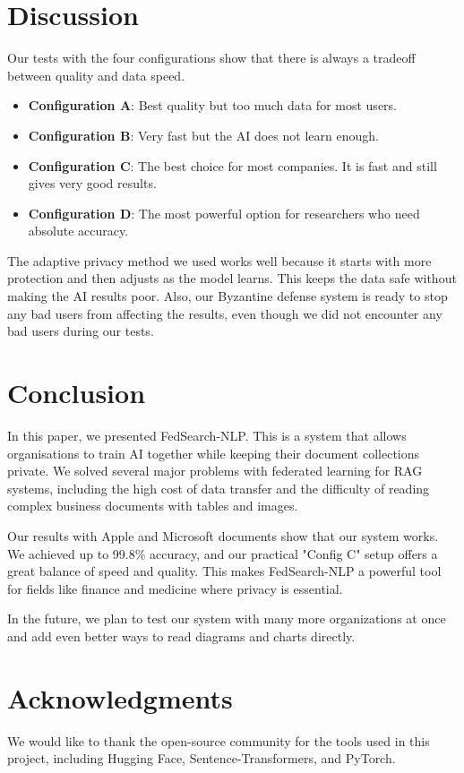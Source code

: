\documentclass[acmsmall,screen]{acmart}
\begin{document}
\section{Discussion}

Our tests with the four configurations show that there is always a tradeoff between quality and data speed.

\begin{itemize}
    \item \textbf{Configuration A}: Best quality but too much data for most users.
    \item \textbf{Configuration B}: Very fast but the AI does not learn enough.
    \item \textbf{Configuration C}: The best choice for most companies. It is fast and still gives very good results.
    \item \textbf{Configuration D}: The most powerful option for researchers who need absolute accuracy.
\end{itemize}

The adaptive privacy method we used works well because it starts with more protection and then adjusts as the model learns. This keeps the data safe without making the AI results poor. Also, our Byzantine defense system is ready to stop any bad users from affecting the results, even though we did not encounter any bad users during our tests.

\section{Conclusion}

In this paper, we presented FedSearch-NLP. This is a system that allows organisations to train AI together while keeping their document collections private. We solved several major problems with federated learning for RAG systems, including the high cost of data transfer and the difficulty of reading complex business documents with tables and images.

Our results with Apple and Microsoft documents show that our system works. We achieved up to 99.8\% accuracy, and our practical "Config C" setup offers a great balance of speed and quality. This makes FedSearch-NLP a powerful tool for fields like finance and medicine where privacy is essential.

In the future, we plan to test our system with many more organizations at once and add even better ways to read diagrams and charts directly.

\section*{Acknowledgments}
We would like to thank the open-source community for the tools used in this project, including Hugging Face, Sentence-Transformers, and PyTorch.
\end{document}
